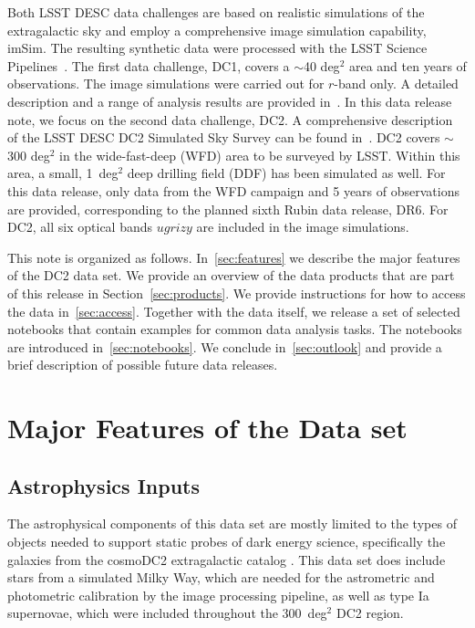 \documentclass[11pt]{report}
\begin{document}
Both LSST DESC data challenges are based on realistic simulations of the extragalactic sky and employ a comprehensive image simulation capability, imSim. The resulting synthetic data were processed with the LSST Science Pipelines~\citep{2017ASPC..512..279J}. The first data challenge, DC1, covers a $\sim$40 deg$^2$ area and ten years of observations. The image simulations were carried out for $r$-band only. A detailed description and a range of analysis results are provided in~\cite{dc1}.  In this data release note, we focus on the second data challenge, DC2. A comprehensive description of the LSST DESC DC2 Simulated Sky Survey can be found in~\cite{2020arXiv201005926L}. DC2 covers $\sim$300 deg$^2$ in the wide-fast-deep (WFD) area to be surveyed by LSST. Within this area, a small, 1~deg$^2$ deep drilling field (DDF) has been simulated as well. For this data release, only data from the WFD campaign and 5 years of observations are provided, corresponding to the planned sixth Rubin data release, DR6. For DC2, all six optical bands $ugrizy$ are included in the image simulations.  



This note is organized as follows. In~\autoref{sec:features} we describe the major features of the DC2 data set. We provide an overview of the data products that are part of this release in Section~\autoref{sec:products}. We provide instructions for how to access the data in~\autoref{sec:access}. Together with the data itself, we release a set of selected notebooks that contain examples for common data analysis tasks. The notebooks are introduced in~\autoref{sec:notebooks}.
We conclude in~\autoref{sec:outlook} and provide a brief description of possible future data releases. 

\section{Major Features of the Data set}
\label{sec:features}

\subsection{Astrophysics Inputs}

The astrophysical components of this data set are mostly limited to the types of objects needed to support static probes of dark energy science, specifically the galaxies from the cosmoDC2 extragalactic catalog \citep{korytov}.  This data set does include stars from a simulated Milky Way, which are needed for the astrometric and photometric calibration by the image processing pipeline, as well as type Ia supernovae, which were included throughout the 300~deg$^2$ DC2 region.
\end{document}
